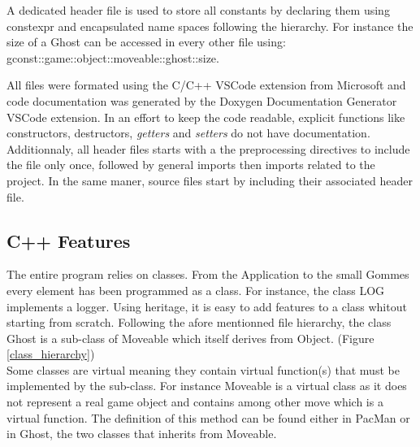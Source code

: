 A dedicated header file is used to store all constants by declaring them using \textsf{constexpr} and encapsulated name spaces following the hierarchy. For instance the size of a \textsf{Ghost} can be accessed in every other file using: \textsf{gconst::game::object::moveable::ghost::size}.

All files were formated using the C/C++ VSCode extension from Microsoft and code documentation was generated by the Doxygen Documentation Generator VSCode extension.\cite{cpp_tools}\cite{gen_doc} In an effort to keep the code readable, explicit functions like constructors, destructors, \textit{getters} and \textit{setters} do not have documentation.
Additionnaly, all header files starts with a the preprocessing directives to include the file only once, followed by general imports then imports related to the project. In the same maner, source files start by including their associated header file.

\subsection{C++ Features}
The entire program relies on classes. From the \textsf{Application} to the small \textsf{Gommes} every element has been programmed as a class. For instance, the class \textsf{LOG} implements a logger. Using heritage, it is easy to add features to a class whitout starting from scratch. Following the afore mentionned file hierarchy, the class \textsf{Ghost} is a sub-class of \textsf{Moveable} which itself derives from \textsf{Object}. (Figure \ref{class_hierarchy})\\
Some classes are virtual meaning they contain virtual function(s) that must be implemented by the sub-class. For instance \textsf{Moveable} is a virtual class as it does not represent a real game object and contains among other \textsf{move} which is a virtual function. The definition of this method can be found either in \textsf{PacMan} or in \textsf{Ghost}, the two classes that inherits from \textsf{Moveable}.

